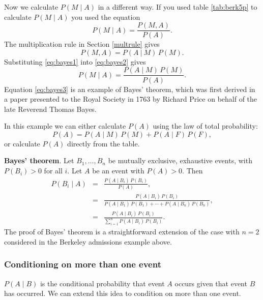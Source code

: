 \documentclass[
  british,
]{book}
\begin{document}
\FloatBarrier

Now we calculate \(P(M \mid A)\) in a different way. If you used table \ref{tab:berk5p} to calculate \(P(M \mid A)\) you used the equation
\begin{equation}
P(M \mid A) = \frac{P(M , A)}{P(A)}. 
\label{eq:bayes1}
\end{equation}
The multiplication rule in Section \ref{multrule} gives
\begin{equation}
P(M , A) = P(A~|~M)\,P(M). 
\label{eq:bayes2}
\end{equation}
Substituting \eqref{eq:bayes1} into \eqref{eq:bayes2} gives
\begin{equation}
P(M \mid A) = \frac{P(A \mid M)\,P(M)}{P(A)}. 
\label{eq:bayes3}
\end{equation}
Equation \eqref{eq:bayes3} is an example of Bayes' theorem, which was first derived in a paper presented to the Royal Society in 1763 by Richard Price on behalf of the late Reverend Thomas Bayes.

In this example we can either calculate \(P(A)\) using the law of total probability:
\[ P(A) = P(A \mid M)\,P(M) + P(A \mid F)\,P(F), \]
or calculate \(P(A)\) directly from the table.

\textbf{Bayes' theorem}. Let \(B_1, \ldots, B_n\) be mutually exclusive, exhaustive events, with \(P(B_i) > 0\) for all \(i\). Let \(A\) be an event with \(P(A) > 0\). Then
\begin{eqnarray}
P(B_i \mid A) &=& \frac{P(A \mid B_i)\,P(B_i)}{P(A)}, \\ 
&=& \frac{P(A \mid B_i)\,P(B_i)}{P(A \mid B_1)\,P(B_1) + \cdots + P(A \mid B_n)\,P(B_n)}, \\
          &=& \frac{P(A \mid B_i)\,P(B_i)}{\displaystyle\sum_{i=1}^n P(A \mid B_i)\,P(B_i)}.
\end{eqnarray}
The proof of Bayes' theorem is a straightforward extension of the case with \(n=2\) considered in the Berkeley admissions example above.

\hypertarget{conditioning-on-more-than-one-event}{%
\subsubsection*{Conditioning on more than one event}\label{conditioning-on-more-than-one-event}}

\(P(A \mid B)\) is the conditional probability that event \(A\) occurs given that event \(B\) has occurred. We can extend this idea to condition on more than one event.
\end{document}
